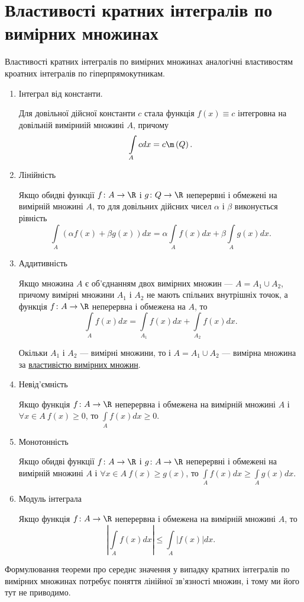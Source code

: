 \section{Властивості кратних інтегралів по вимірних множинах}
Властивості кратних інтегралів по вимірних множинах аналогічні властивостям кроатних інтегралів по гіперпрямокутникам.
\begin{enumerate}
\item Інтеграл від константи.
\begin{intextProposition}
Для довільної дійсної константи $c$ стала функція ${f(x) \equiv c}$ інтегровна на довільній вимірниій множині $A$, причому
\[
\int\limits_{A} c d x = c\m\left(Q\right).
\]
\end{intextProposition}
\item Лінійність
\begin{intextProposition}
Якщо обидві функції ${f\colon A \to \R}$ і ${g\colon Q \to \R}$ неперервні і обмежені на вимірній множині $A$, то для довільних дійсних чисел $\alpha$ і $\beta$ виконується рівність
\[
\int\limits_{A} \left(\alpha f(x) + \beta g(x)\right)d x = \alpha\int\limits_{A} f(x) d x + \beta\int\limits_{A} g(x) d x.
\]
\end{intextProposition}
\item Аддитивність
\begin{intextProposition}
Якщо множина $A$ є об'єднанням двох вимірних множин --- ${A = A_1 \cup A_2}$, причому вимірні множини $A_1$ і $A_2$ не мають спільних внутрішніх точок, а функція ${f\colon A \to \R}$ неперервна і обмежена на $A$, то
\[
\int\limits_{A} f(x) d x = \int\limits_{A_1} f(x) d x + \int\limits_{A_2} f(x) d x.
\]
\end{intextProposition}
\begin{remark}
Окільки $A_1$ і $A_2$ --- вимірні множини, то і ${A = A_1 \cup A_2}$ --- вимірна множина за \hyperref[prop:measrable_sets:1]{властивістю вимірних множин}.
\end{remark}
\item Невід'ємність
\begin{intextProposition}
Якщо функція ${f\colon A \to \R}$ неперервна і обмежена на вимірній множині $A$ і ${\forall x\in A\ f(x)\geq 0}$, то ${\int\limits_{A} f(x) d x \geq 0.}$
\end{intextProposition}
\item Монотонність
\begin{intextProposition}
Якщо обидві функції ${f\colon A \to \R}$ і ${g\colon A \to \R}$ неперервні і обмежені на вимірній множині $A$ і ${\forall x\in A\ f(x)\geq g(x)}$, то ${\int\limits_{A} f(x) d x \geq \int\limits_{A} g(x) d x.}$
\end{intextProposition}
\item Модуль інтеграла
\begin{intextProposition}
Якщо функція ${f\colon A \to \R}$ неперервна і обмежена на вимірній множині $A$, то
\[
\left|\int\limits_{A} f(x) d x\right| \leq \int\limits_{A} \left|f(x)\right| d x.
\]
\end{intextProposition}
\end{enumerate}
\begin{remark}
Формулювання теореми про середнє значення у випадку кратних інтегралів по вимірних множинах потребує поняття лінійної зв'язності множин, і тому ми його тут не приводимо.
\end{remark}
